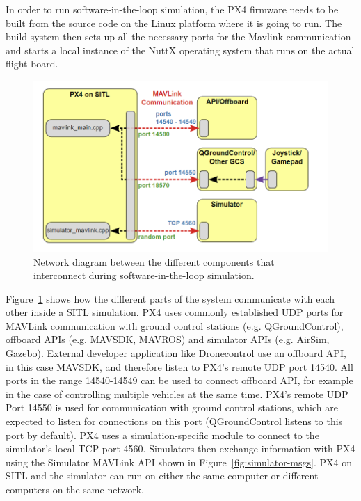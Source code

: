 In order to run software-in-the-loop simulation, the PX4 firmware needs to be built from the source code on the Linux platform where it is going to run.
The build system then sets up all the necessary ports for the Mavlink communication and starts a local instance of the NuttX operating system that runs on the actual flight board.
\begin{figure}
  \centering
  \includegraphics[width=\textwidth,keepaspectratio]{img/px4-ports.png}
  \caption{Network diagram between the different components that interconnect during software-in-the-loop simulation.}\label{fig:px4-ports}
\end{figure}
Figure~\ref{fig:px4-ports} shows how the different parts of the system communicate with each other inside a SITL simulation.
PX4 uses commonly established UDP ports for MAVLink communication with ground control stations (e.g. QGroundControl), offboard APIs (e.g. MAVSDK, MAVROS) and simulator APIs (e.g. AirSim, Gazebo).
External developer application like Dronecontrol use an offboard API, in this case MAVSDK, and therefore listen to PX4's remote UDP port 14540.
All ports in the range 14540-14549 can be used to connect offboard API, for example in the case of controlling multiple vehicles at the same time.
PX4's remote UDP Port 14550 is used for communication with ground control stations, which are expected to listen for connections on this port (QGroundControl listens to this port by default).
PX4 uses a simulation-specific module to connect to the simulator's local TCP port 4560. 
Simulators then exchange information with PX4 using the Simulator MAVLink API shown in Figure~\ref{fig:simulator-msgs}. 
PX4 on SITL and the simulator can run on either the same computer or different computers on the same network.

